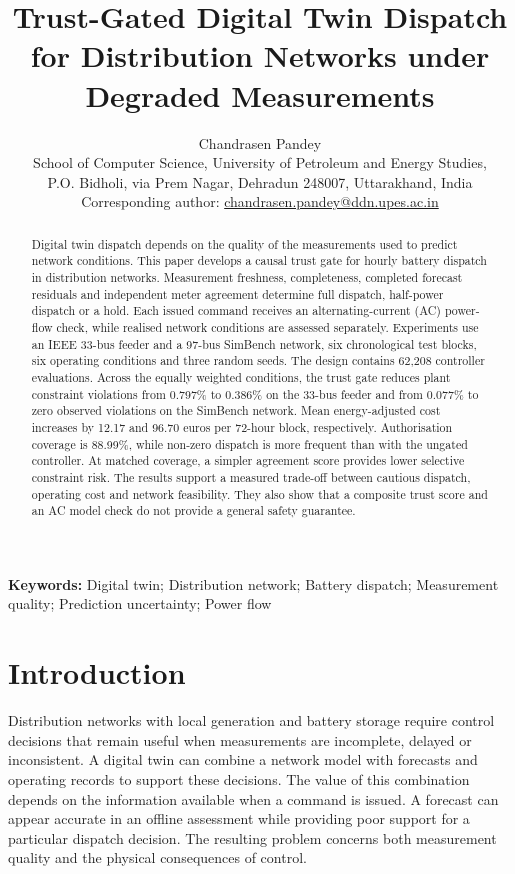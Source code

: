 \documentclass[11pt,a4paper]{article}
\title{Trust-Gated Digital Twin Dispatch for Distribution Networks under Degraded Measurements}
\author{Chandrasen Pandey\\[4pt]
\small School of Computer Science, University of Petroleum and Energy Studies,\\
\small P.O. Bidholi, via Prem Nagar, Dehradun 248007, Uttarakhand, India\\
\small Corresponding author: \href{mailto:chandrasen.pandey@ddn.upes.ac.in}{chandrasen.pandey@ddn.upes.ac.in}}
\date{}
\begin{document}
\maketitle
\begin{abstract}
Digital twin dispatch depends on the quality of the measurements used to predict network conditions. This paper develops a causal trust gate for hourly battery dispatch in distribution networks. Measurement freshness, completeness, completed forecast residuals and independent meter agreement determine full dispatch, half-power dispatch or a hold. Each issued command receives an alternating-current (AC) power-flow check, while realised network conditions are assessed separately. Experiments use an IEEE 33-bus feeder and a 97-bus SimBench network, six chronological test blocks, six operating conditions and three random seeds. The design contains 62,208 controller evaluations. Across the equally weighted conditions, the trust gate reduces plant constraint violations from 0.797\% to 0.386\% on the 33-bus feeder and from 0.077\% to zero observed violations on the SimBench network. Mean energy-adjusted cost increases by 12.17 and 96.70 euros per 72-hour block, respectively. Authorisation coverage is 88.99\%, while non-zero dispatch is more frequent than with the ungated controller. At matched coverage, a simpler agreement score provides lower selective constraint risk. The results support a measured trade-off between cautious dispatch, operating cost and network feasibility. They also show that a composite trust score and an AC model check do not provide a general safety guarantee.
\end{abstract}
\noindent\textbf{Keywords:} Digital twin; Distribution network; Battery dispatch; Measurement quality; Prediction uncertainty; Power flow

\section{Introduction}\label{sec:intro}
Distribution networks with local generation and battery storage require control decisions that remain useful when measurements are incomplete, delayed or inconsistent. A digital twin can combine a network model with forecasts and operating records to support these decisions. The value of this combination depends on the information available when a command is issued. A forecast can appear accurate in an offline assessment while providing poor support for a particular dispatch decision. The resulting problem concerns both measurement quality and the physical consequences of control.
\end{document}

